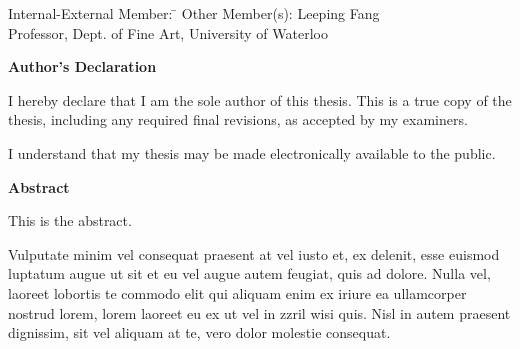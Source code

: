   \noindent
\begin{tabbing}
Internal-External Member: \=  \kill %
Other Member(s): \> Leeping Fang \\
\> Professor, Dept. of Fine Art, University of Waterloo \\
\end{tabbing}

\cleardoublepage
{}    %

 \begin{center}\textbf{Author's Declaration}\end{center}

 \noindent
I hereby declare that I am the sole author of this thesis. This is a true copy of the thesis, including any required final revisions, as accepted by my examiners.
 \noindent  
  \bigskip
  
  \noindent
I understand that my thesis may be made electronically available to the public.

\cleardoublepage
{}    %

\begin{center}\textbf{Abstract}\end{center}

This is the abstract.

Vulputate minim vel consequat praesent at vel iusto et, ex delenit, esse euismod luptatum augue ut sit et eu vel augue autem feugiat, quis ad dolore. Nulla vel, laoreet lobortis te commodo elit qui aliquam enim ex iriure ea ullamcorper nostrud lorem, lorem laoreet eu ex ut vel in zzril wisi quis. Nisl in autem praesent dignissim, sit vel aliquam at te, vero dolor molestie consequat.

